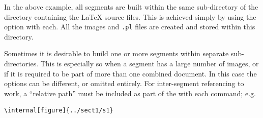 %
In the above example, all segments are built within the same sub-directory
 of the directory containing the \LaTeX{} source files.
This is achieved simply by using the option  with each.
All the images and \texttt{.pl} files
are created and stored within this directory.

%
\html{\\}%
Sometimes it is desirable to build one or more segments within
separate sub-directories. 
This is especially so when a segment has a large number of images, 
or if it is required to be part of more than one combined document. 
In this case the  options can be different, 
or omitted entirely. For inter-segment referencing to work,
a ``relative path'' must be included as part of the 
with each  command; e.g.
\begin{verbatim}
\internal[figure]{../sect1/s1}
\end{verbatim}

%










